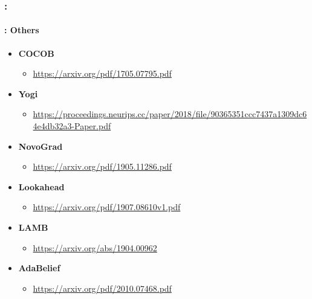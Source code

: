 \documentclass[xcolor=table]{beamer}
\begin{document}
\begin{frame}
	\frametitle{\insertshortsubtitle: \insertsection}
	\framesubtitle{\insertsubsection: Others}
	
	\begin{itemize}
		\item \textbf{COCOB} \cite{orabona2017training}
		\begin{itemize}
			\item {\scriptsize \url{https://arxiv.org/pdf/1705.07795.pdf}}
		\end{itemize}
		 
		\item \textbf{Yogi} \cite{zaheer2018adaptive} 
		\begin{itemize}
			\item {\scriptsize \url{https://proceedings.neurips.cc/paper/2018/file/90365351ccc7437a1309dc64e4db32a3-Paper.pdf}}
		\end{itemize}
		
		\item \textbf{NovoGrad} \cite{ginsburg2019training} 
		\begin{itemize}
			\item {\scriptsize \url{https://arxiv.org/pdf/1905.11286.pdf}} 
		\end{itemize}
		
		\item \textbf{Lookahead} \cite{10.5555/3454287.3455148} 
		\begin{itemize}
			\item {\scriptsize \url{https://arxiv.org/pdf/1907.08610v1.pdf}} 
		\end{itemize}
		
		\item \textbf{LAMB} \cite{you2020large} 
		\begin{itemize}
			\item {\scriptsize \url{https://arxiv.org/abs/1904.00962}}
		\end{itemize}
		 
		\item \textbf{AdaBelief} \cite{zhuang2020adabelief} 
		\begin{itemize}
			\item {\scriptsize \url{https://arxiv.org/pdf/2010.07468.pdf}}
		\end{itemize}
		
		
		
	\end{itemize}
	
\end{frame}
\end{document}
